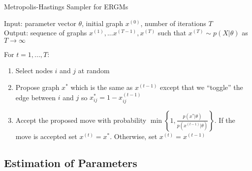 
\begin{algorithm}
	\caption{Metropolis-Hastings Sampler for ERGMs}
	Input: parameter vector $\theta$, initial graph $x^{(0)}$, number of iterations $T$ \\
	Output: sequence of graphs $x^{(1)},...x^{(T-1)},x^{(T)}$ such that $x^{(T)} \sim p(X | \theta)$ as $T \to \infty$
	
	\vspace{0.1in}
		For {$ t = 1,...,T$}:
		\begin{enumerate}
			\item  Select nodes $i$ and $j$ at random
			\item Propose graph $x^*$ which is the same as $x^{(t-1)}$ except that we ``toggle'' the edge between $i$ and $j$ so $x^*_{ij} = 1 - x^{(t-1)}_{ij}$
			\item Accept the proposed move with probability $\min\left\{1, \frac{p(x^* | \theta)}{p(x^{(t-1)} | \theta)} \right\}$. If the move is accepted set $x^{(t)} = x^*$. Otherwise, set $x^{(t)} = x^{(t-1)}$
		\end{enumerate}
\end{algorithm}

\subsection{Estimation of Parameters}



